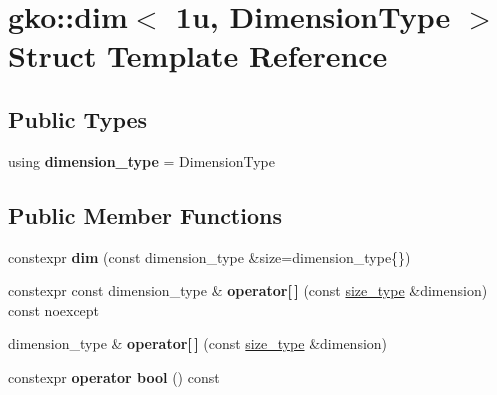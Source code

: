 \hypertarget{structgko_1_1dim_3_011u_00_01DimensionType_01_4}{}\section{gko\+:\+:dim$<$ 1u, Dimension\+Type $>$ Struct Template Reference}
\label{structgko_1_1dim_3_011u_00_01DimensionType_01_4}
\subsection*{Public Types}
\begin{DoxyCompactItemize}
\item 
\mbox{\label{structgko_1_1dim_3_011u_00_01DimensionType_01_4_ad4748a0793b616ca0c5947591f06b90e}} 
using {\bfseries dimension\+\_\+type} = Dimension\+Type
\end{DoxyCompactItemize}
\subsection*{Public Member Functions}
\begin{DoxyCompactItemize}
\item 
\mbox{\label{structgko_1_1dim_3_011u_00_01DimensionType_01_4_a74874ebe85da1dfed8c0d464f82f81c5}} 
constexpr {\bfseries dim} (const dimension\+\_\+type \&size=dimension\+\_\+type\{\})
\item 
\mbox{\label{structgko_1_1dim_3_011u_00_01DimensionType_01_4_ad6961c6479e6241a7f07a6be7c0eee06}} 
constexpr const dimension\+\_\+type \& {\bfseries operator\mbox{[}$\,$\mbox{]}} (const \hyperlink{namespacegko_a6e5c95df0ae4e47aab2f604a22d98ee7}{size\+\_\+type} \&dimension) const noexcept
\item 
\mbox{\label{structgko_1_1dim_3_011u_00_01DimensionType_01_4_a3710f5b537fb50a8db3d6250005fa95a}} 
dimension\+\_\+type \& {\bfseries operator\mbox{[}$\,$\mbox{]}} (const \hyperlink{namespacegko_a6e5c95df0ae4e47aab2f604a22d98ee7}{size\+\_\+type} \&dimension)
\item 
\mbox{\label{structgko_1_1dim_3_011u_00_01DimensionType_01_4_a79dc35832a68c7400a1523fc562ccdc7}} 
constexpr {\bfseries operator bool} () const
\end{DoxyCompactItemize}
